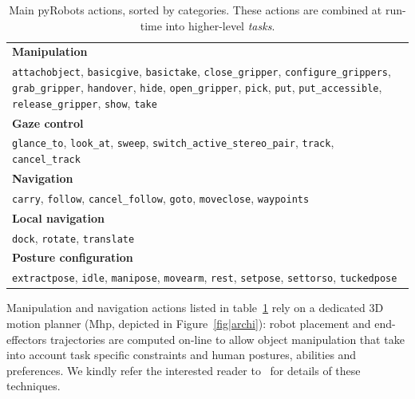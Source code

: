 \documentclass[preprint,3p,times]{elsarticle}
\begin{document}
\begin{table}[ht!]
\begin{center}
\begin{tabular}{p{}}
\hline
    {\bf Manipulation} \\
     {\tt attachobject}, {\tt basicgive}, {\tt basictake}, {\tt close\_gripper}, {\tt configure\_grippers}, {\tt grab\_gripper}, {\tt handover}, {\tt hide}, {\tt open\_gripper}, {\tt pick}, {\tt put}, {\tt put\_accessible}, {\tt release\_gripper}, {\tt show}, {\tt take} \\
\hline
    {\bf Gaze control} \\
     {\tt glance\_to}, {\tt look\_at}, {\tt sweep}, {\tt switch\_active\_stereo\_pair}, {\tt track}, {\tt cancel\_track} \\
\hline
    {\bf Navigation} \\
     {\tt carry}, {\tt follow}, {\tt cancel\_follow}, {\tt goto}, {\tt moveclose}, {\tt waypoints} \\
\hline
    {\bf Local navigation} \\
     {\tt dock}, {\tt rotate}, {\tt translate} \\
\hline
    {\bf Posture configuration} \\
     {\tt extractpose}, {\tt idle}, {\tt manipose}, {\tt movearm}, {\tt rest}, {\tt setpose}, {\tt settorso}, {\tt tuckedpose} \\
\hline
\end{tabular}
\end{center}
\caption{Main {\sc pyRobots} actions, sorted by categories. These
actions are combined at run-time into higher-level \emph{tasks}.}

\label{table|pyrobots_actions}
\end{table}

Manipulation and navigation actions listed in table~\ref{table|pyrobots_actions}
rely on a dedicated 3D motion planner ({\sc Mhp}, depicted in
Figure~\ref{fig|archi}): robot placement and end-effectors trajectories are
computed on-line to allow object manipulation that take into account task
specific constraints and human postures, abilities and preferences.
We kindly refer the interested reader to~\cite{Sisbot2008, Mainprice2011,
Pandey2011} for details of these techniques.
\end{document}
